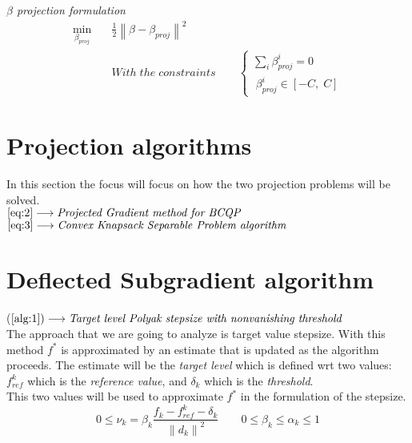 \documentclass[12pt]{article}
\newcommand{\norm}[1]{\left\lVert#1\right\rVert}
\begin{document}
	\emph{$\beta$ projection formulation}
    \begin{equation}\label{eq:3}
	    \begin{aligned}
	    \min_{\beta_{proj}} \quad &\frac{1}{2}\norm{\beta - \beta_{proj}}^2\\ 
		&With\;the\;constraints\qquad
        \begin{cases}
            \sum_i \beta_{proj}^i = 0 \\
            \;\beta_{proj}^i\in[-C,\;C] 
        \end{cases}
        \end{aligned}
	\end{equation}
	
	\section*{Projection algorithms}
	In this section the focus will focus on how the two projection problems will be solved. \\
	$\eqref{eq:2} \longrightarrow \emph{Projected Gradient method for BCQP}$ \\
	$\eqref{eq:3} \longrightarrow \emph{Convex Knapsack Separable Problem algorithm}$
	
	\section*{Deflected Subgradient algorithm}
	($\ref{alg:1}) \longrightarrow \emph{Target level Polyak stepsize with nonvanishing threshold}$ \\
	
    The approach that we are going to analyze is target value stepsize. With this method $f^*$ is approximated by an estimate that is updated as the algorithm proceeds. The estimate will be the  \emph{target level} which is defined wrt two values: $f_{ref}^k$ which is the \emph{reference value}, and $\delta_k$ which is the \emph{threshold}.\\
    This two values will be used to approximate $f^*$ in the formulation of the stepsize.
    \begin{equation}
        0 \leq \nu_k = \beta_k \frac{f_k - f_{ref}^k - \delta_k}{\norm{d_k}^2} \qquad 0 \leq \beta_k \leq \alpha_k \leq 1 
    \end{equation}
    
\end{document}
